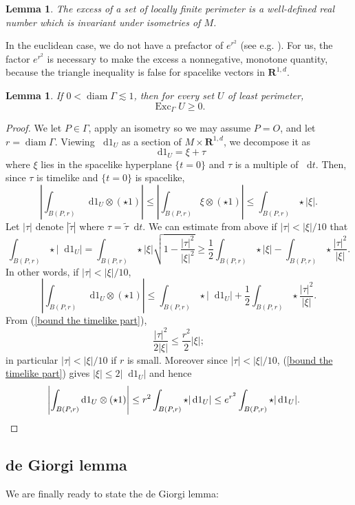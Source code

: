 \documentclass[reqno,10pt]{amsart}
\newcommand{\RR}{\mathbf{R}}
\DeclareMathOperator{\diam}{diam}
\DeclareMathOperator{\Exc}{Exc}
\newcommand*\dif{\mathop{}\!\mathrm{d}}
\newtheorem{lemma}[theorem]{Lemma}
\theoremstyle{definition}
\numberwithin{equation}{section}
\begin{document}
\begin{lemma}
The excess of a set of locally finite perimeter is a well-defined real number which is invariant under isometries of $M$.
\end{lemma}

In the euclidean case, we do not have a prefactor of $e^{r^2}$ (see e.g. \cite[Chapter 6]{Giusti77}).
For us, the factor $e^{r^2}$ is necessary to make the excess a nonnegative, monotone quantity, because the triangle inequality is false for spacelike vectors in $\RR^{1, d}$.

\begin{lemma}
If $0 < \diam \Gamma \lesssim 1$, then for every set $U$ of least perimeter,
$$\Exc_\Gamma U \geq 0.$$
\end{lemma}
\begin{proof}
We let $P \in \Gamma$, apply an isometry so we may assume $P = O$, and let $r = \diam \Gamma$.
Viewing $\dif 1_U$ as a section of $M \times \RR^{1, d}$, we decompose it as
$$\dif 1_U = \xi + \tau$$
where $\xi$ lies in the spacelike hyperplane $\{t = 0\}$ and $\tau$ is a multiple of $\dif t$.
Then, since $\tau$ is timelike and $\{t = 0\}$ is spacelike,
$$\left|\int_{B(P, r)} \dif 1_U \otimes (\star 1)\right| \leq \left|\int_{B(P, r)} \xi \otimes (\star 1)\right| \leq \int_{B(P, r)} \star |\xi|.$$
Let $|\tau|$ denote $|\tilde \tau|$ where $\tau = \tilde \tau \dif t$.
We can estimate from above if $|\tau| < |\xi|/10$ that
$$\int_{B(P, r)} \star |\dif 1_U| = \int_{B(P, r)} \star |\xi| \sqrt{1 - \frac{|\tau|^2}{|\xi|^2}} \geq \frac{1}{2} \int_{B(P, r)} \star |\xi| - \int_{B(P, r)} \star \frac{|\tau|^2}{|\xi|}.$$
In other words, if $|\tau| < |\xi|/10$,
$$\left|\int_{B(P, r)} \dif 1_U \otimes (\star 1)\right| \leq \int_{B(P, r)} \star |\dif 1_U| + \frac{1}{2} \int_{B(P, r)} \star \frac{|\tau|^2}{|\xi|}.$$
From (\ref{bound the timelike part}),
$$\frac{|\tau|^2}{2|\xi|} \leq \frac{r^2}{2} |\xi|;$$
in particular $|\tau| < |\xi|/10$ if $r$ is small.
Moreover since $|\tau| < |\xi|/10$, (\ref{bound the timelike part}) gives $|\xi| \leq 2|\dif 1_U|$ and hence
\begin{align*}
\left|\int_{B(P, r)} \dif 1_U \otimes (\star 1)\right| &\leq r^2 \int_{B(P, r)} \star |\dif 1_U| \leq e^{r^2} \int_{B(P, r)} \star |\dif 1_U|. \qedhere
\end{align*}
\end{proof}



\subsection{de Giorgi lemma}
We are finally ready to state the de Giorgi lemma:
\end{document}
